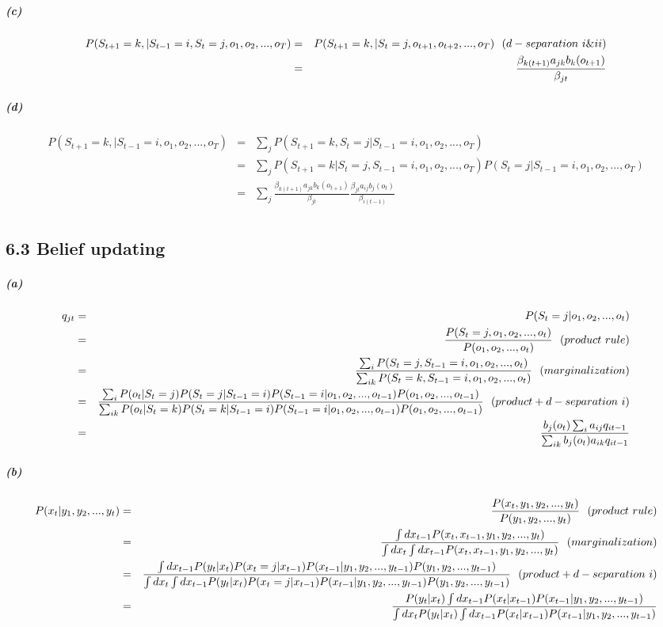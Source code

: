 \documentclass{article}
\newcommand{\RNum}[1]{\uppercase\expandafter{\romannumeral #1\relax}}
\begin{document}
\subparagraph*{(c)}
\begin{eqnarray*}
	P(S_{t+1}=k, |S_{t-1}=i, S_t=j , o_1, o_2, ..., o_T ) &=& P(S_{t+1}=k, | S_t=j , o_{t+1}, o_{t+2}, ..., o_T )~~(d-separation~\RNum{1}\&\RNum{2})\\
	&=& \frac{\beta_{k(t+1)}a_{jk}b_k(o_{t+1})}{\beta_{jt}}
\end{eqnarray*}

\subparagraph*{(d)}
\begin{eqnarray*}
	P(S_{t+1}=k, |S_{t-1}=i , o_1, o_2, ..., o_T ) 
	&=& \sum_j P(S_{t+1}=k, S_t=j|S_{t-1}=i , o_1, o_2, ..., o_T )\\
	&=& \sum_j P(S_{t+1}=k | S_t=j, S_{t-1}=i , o_1, o_2, ..., o_T )P(S_t=j| S_{t-1}=i , o_1, o_2, ..., o_T )\\
	&=& \sum_j \frac{\beta_{k(t+1)}a_{jk}b_k (o_{t+1})}{\beta_{jt}} \frac{\beta_{jt}a_{ij}b_j( o_{t})}{\beta_{i(t-1)}}\\
\end{eqnarray*}

\subsection*{6.3 Belief updating}
\subparagraph*{(a)}
\begin{eqnarray*}
q_{jt} &=& P(S_t = j | o_1, o_2, ..., o_t)\\
&=& \frac{P(S_t = j , o_1, o_2, ..., o_t)}{P(o_1, o_2, ..., o_t)}~~(product~rule)\\
&=&  \frac{\sum_i P(S_t = j , S_{t-1}=i, o_1, o_2, ..., o_t)}{\sum_{ik} P(S_t=k, S_{t-1}=i, o_1, o_2, ..., o_t)}~~(marginalization)\\
&=&  \frac{\sum_i P(o_t | S_t = j)P(S_t = j | S_{t-1}=i)P(S_{t-1}=i | o_1, o_2, ..., o_{t-1})P(o_1, o_2, ..., o_{t-1})}{\sum_{ik} P(o_t | S_t = k)P(S_t = k | S_{t-1}=i)P(S_{t-1}=i | o_1, o_2, ..., o_{t-1})P(o_1, o_2, ..., o_{t-1})}~~(product + d-separation~\RNum{1})\\
&=&\frac{b_j(o_t) \sum_i a_{ij}q_{it-1}}{\sum_{ik} b_j(o_t)a_{ik}q_{it-1}}
\end{eqnarray*}

\subparagraph*{(b)}
\begin{eqnarray*}
	P(x_t | y_1, y_2, ..., y_t) 
	&=& \frac{P(x_t , y_1, y_2, ..., y_t)}{P(y_1, y_2, ..., y_t)}~~(product~rule)\\
	&=&  \frac{\int dx_{t-1}P(x_t , x_{t-1}, y_1, y_2, ..., y_t)}{\int dx_{t}\int dx_{t-1}P(x_t , x_{t-1}, y_1, y_2, ..., y_t)}~~(marginalization)\\
	&=&  \frac{\int dx_{t-1} P(y_t | x_t)P(x_t = j | x_{t-1})P(x_{t-1} | y_1, y_2, ..., y_{t-1})P(y_1, y_2, ..., y_{t-1})}{\int dx_{t} \int dx_{t-1} P(y_t | x_t)P(x_t = j | x_{t-1})P(x_{t-1} | y_1, y_2, ..., y_{t-1})P(y_1, y_2, ..., y_{t-1})}~~(product + d-separation~\RNum{1})\\
	&=&\frac{P(y_t | x_t) \int dx_{t-1} P(x_t | x_{t-1})P(x_{t-1} | y_1, y_2, ..., y_{t-1})}{\int dx_{t}P(y_t | x_t) \int dx_{t-1} P(x_t | x_{t-1})P(x_{t-1} | y_1, y_2, ..., y_{t-1})}
\end{eqnarray*}
\end{document}
